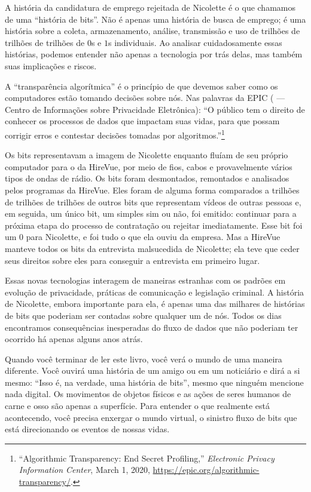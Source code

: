 A história da candidatura de emprego rejeitada de Nicolette é o que chamamos de 
uma ``história de bits''. Não é apenas uma história de busca de emprego; é uma
história sobre a coleta, armazenamento, análise, transmissão e uso de trilhões
de trilhões de trilhões de $0$s e $1$s individuais. Ao analisar cuidadosamente
essas histórias, podemos entender não apenas a tecnologia por trás delas, mas
também suas implicações e riscos.

\begin{tcolorbox}
A ``transparência algorítmica'' é o princípio de que devemos saber como os
computadores estão tomando decisões sobre nós. Nas palavras da EPIC
( --- Centro de Informações sobre
Privacidade Eletrônica): ``O público tem o direito de conhecer os processos de
dados que impactam suas vidas, para que possam corrigir erros e contestar
decisões tomadas por algoritmos.''\footnote{``Algorithmic Transparency: End
Secret Profiling,'' \textit{Electronic Privacy Information Center}, March 1,
2020, \url{https://epic.org/algorithmic-transparency/}.}
\end{tcolorbox}

Os bits representavam a imagem de Nicolette enquanto fluíam de seu próprio
computador para o da HireVue, por meio de fios, cabos e provavelmente vários
tipos de ondas de rádio. Os bits foram desmontados, remontados e analisados
pelos programas da HireVue. Eles foram de alguma forma comparados a trilhões de
trilhões de trilhões de outros bits que representam vídeos de outras pessoas e,
em seguida, um único bit, um simples sim ou não, foi emitido: continuar para a
próxima etapa do processo de contratação ou rejeitar imediatamente. Esse bit foi
um $0$ para Nicolette, e foi tudo o que ela ouviu da empresa. Mas a HireVue
manteve todos os bits da entrevista malsucedida de Nicolette; ela teve que ceder
seus direitos sobre eles para conseguir a entrevista em primeiro lugar.

Essas novas tecnologias interagem de maneiras estranhas com os padrões em
evolução de privacidade, práticas de comunicação e legislação criminal. A
história de Nicolette, embora importante para ela, é apenas uma das milhares de
histórias de bits que poderiam ser contadas sobre qualquer um de nós. Todos os
dias encontramos consequências inesperadas do fluxo de dados que não poderiam
ter ocorrido há apenas alguns anos atrás.

Quando você terminar de ler este livro, você verá o mundo de uma maneira 
diferente. Você ouvirá uma história de um amigo ou em um noticiário e dirá a si 
mesmo: ``Isso é, na verdade, uma história de bits'', mesmo que ninguém mencione
nada digital. Os movimentos de objetos físicos e as ações de seres humanos de 
carne e osso são apenas a superfície. Para entender o que realmente está 
acontecendo, você precisa enxergar o mundo virtual, o sinistro fluxo de bits 
que está direcionando os eventos de nossas vidas.

